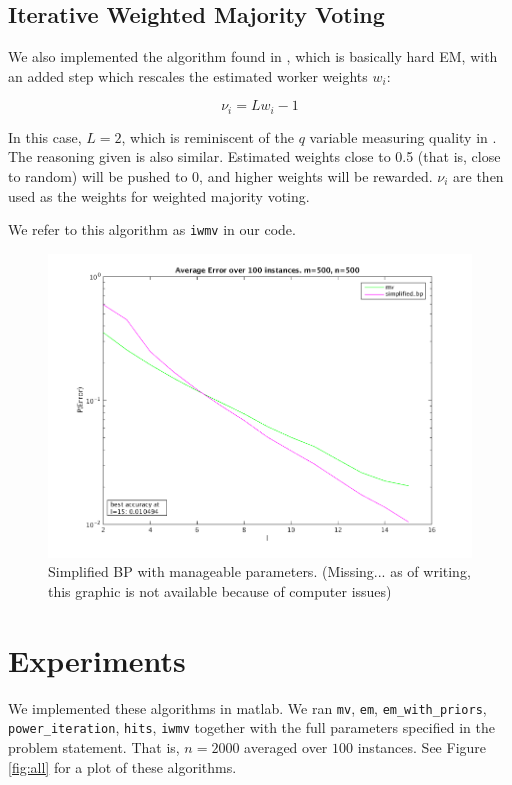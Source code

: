 \documentclass[11pt]{article}
\begin{document}
\subsection{Iterative Weighted Majority Voting}

We also implemented the algorithm found in \cite{li2014error}, which is basically hard EM, with an added step which rescales the estimated worker weights $w_i$:

\[ \nu_i = Lw_i - 1 \]

In this case, $L=2$, which is reminiscent of the $q$ variable measuring quality in \cite{karger2014budget}. The reasoning given is also similar. Estimated weights close to 0.5 (that is, close to random) will be pushed to 0, and higher weights will be rewarded. $\nu_i$ are then used as the weights for weighted majority voting.

We refer to this algorithm as \texttt{iwmv} in our code.

\begin{figure}[t]
\centering
\includegraphics[scale=0.6]{mv_simplified.png}
\caption{Simplified BP with manageable parameters. (Missing... as of writing, this graphic is not available because of computer issues)}
\label{fig:simp}
\end{figure}

\section{Experiments}
We implemented these algorithms in matlab. We ran \texttt{mv}, \texttt{em}, \texttt{em\_with\_priors}, \texttt{power\_iteration}, \texttt{hits}, \texttt{iwmv} together with the full parameters specified in the problem statement. That is, $n=2000$ averaged over $100$ instances. See Figure \ref{fig:all} for a plot of these algorithms.
\end{document}
